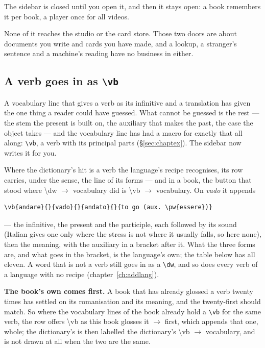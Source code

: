 \documentclass[11pt,oneside]{report}
\newcommand{\pw}[1]{\babelsublr{\mbox{\foreignlanguage{persian}{#1}}}}
\newcommand{\iw}[1]{\foreignlanguage{italian}{\emph{#1}}}
\newcommand{\menu}[1]{\textsf{#1}}
\begin{document}
The sidebar is closed until you open it, and then it stays open: a book
remembers it per book, a player once for all videos.

\noindent None of it reaches the studio or the card store. Those two doors
are about documents you write and cards you have made, and a lookup, a
stranger's sentence and a machine's reading have no business in either.

\subsection*{A verb goes in as \texttt{\textbackslash vb}}
\label{sec:verbs}

A vocabulary line that gives a verb as its infinitive and a translation has
given the one thing a reader could have guessed. What cannot be guessed is
the rest --- the stem the present is built on, the auxiliary that makes the
past, the case the object takes --- and the vocabulary line has had a macro
for exactly that all along: \texttt{\textbackslash vb}, a verb with its
principal parts (\S\ref{sec:chaptex}). The sidebar now writes it for you.

Where the dictionary's hit is a verb the language's recipe recognises, its row
carries, under the sense, the line of its forms --- and in a book, the button
that stood where \menu{\textbackslash dw $\rightarrow$ vocabulary} did is
\menu{\textbackslash vb $\rightarrow$ vocabulary}. On \iw{vado} it appends

\begin{lstlisting}
\vb{andare}{}{vado}{}{andato}{}{to go (aux. \pw{essere})}
\end{lstlisting}

\noindent --- the infinitive, the present and the participle, each followed
by its sound (Italian gives one only where the stress is not where it
usually falls, so here none), then the meaning, with the auxiliary in a
bracket after it. What the three forms are, and what goes in the bracket,
is the language's own; the table below has all eleven. A word that is not a
verb still goes in as a \texttt{\textbackslash dw}, and so does every verb of
a language with no recipe (chapter~\ref{ch:addlang}).

\textbf{The book's own comes first.} A book that has already glossed a verb
twenty times has settled on its romanisation and its meaning, and the
twenty-first should match. So where the vocabulary lines of the book already
hold a \texttt{\textbackslash vb} for the same verb, the row offers
\menu{\textbackslash vb as this book glosses it $\rightarrow$} first, which
appends that one, whole; the dictionary's is then labelled \menu{the
dictionary's \textbackslash vb $\rightarrow$ vocabulary}, and is not drawn
at all when the two are the same.
\end{document}
